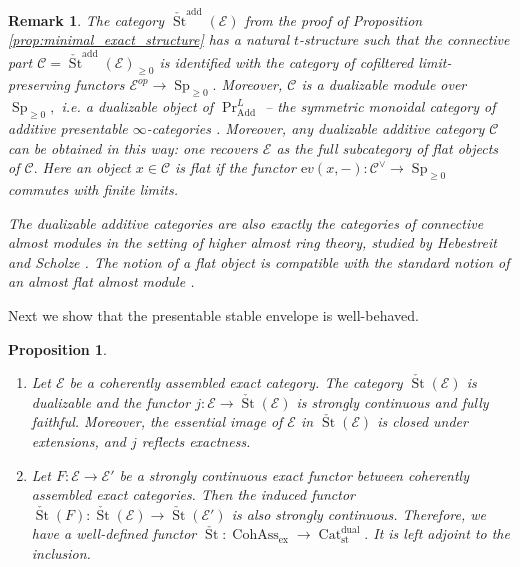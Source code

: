 \documentclass[11pt,leqno]{amsart}
\newtheorem{prop}[theo]{Proposition}
\newtheorem{remark}[theo]{Remark}
\numberwithin{equation}{section}
\newcommand{\Cat}{\operatorname{Cat}}
\newcommand{\ex}{\operatorname{ex}}
\newcommand{\St}{\operatorname{St}}
\newcommand{\st}{\operatorname{st}}
\newcommand{\dual}{\operatorname{dual}}
\newcommand{\ev}{\mathrm ev}
\newcommand{\cC}{{\mathcal C}}
\newcommand{\cE}{{\mathcal E}}
\newcommand{\Cohass}{\operatorname{CohAss}}
\newcommand{\Add}{\operatorname{Add}}
\newcommand{\Sp}{\operatorname{Sp}}
\newcommand{\add}{\operatorname{add}}
\begin{document}
\begin{remark}\label{rem:dualizable_additive_infty_categories}
The category $\check{\St}^{\add}(\cE)$ from the proof of Proposition \ref{prop:minimal_exact_structure} has a natural $t$-structure such that the connective part $\cC=\check{\St}^{\add}(\cE)_{\geq 0}$ is identified with the category of cofiltered limit-preserving functors $\cE^{op}\to\Sp_{\geq 0}.$ Moreover, $\cC$ is a dualizable module over $\Sp_{\geq 0},$ i.e. a dualizable object of $\Pr^L_{\Add}$ -- the symmetric monoidal category of additive presentable $\infty$-categories \cite{LLS}. Moreover, any dualizable additive category $\cC$ can be obtained in this way: one recovers $\cE$ as the full subcategory of flat objects of $\cC.$ Here an object $x\in\cC$ is flat if the functor $\ev(x,-):\cC^{\vee}\to\Sp_{\geq 0}$ commutes with finite limits.

The dualizable additive categories are also exactly the categories of connective almost modules in the setting of higher almost ring theory, studied by Hebestreit and Scholze \cite{HS24}. The notion of a flat object is compatible with the standard notion of an almost flat almost module \cite{Fa02, GR03}.
\end{remark}

Next we show that the presentable stable envelope is well-behaved.

\begin{prop}\label{prop:St_of_coherently_assembled}
\begin{enumerate}[label=(\roman*),ref=(\roman*)]
	\item Let $\cE$ be a coherently assembled exact category. The category $\check{\St}(\cE)$ is dualizable and the functor $j:\cE\to\check{\St}(\cE)$ is strongly continuous and fully faithful. Moreover, the essential image of $\cE$ in $\check{\St}(\cE)$ is closed under extensions, and $j$ reflects exactness. \label{St_of_coh_ass}
	\item Let $F:\cE\to\cE'$ be a strongly continuous exact functor between coherently assembled exact categories. Then the induced functor $\check{\St}(F):\check{\St}(\cE)\to\check{\St}(\cE')$ is also strongly continuous. Therefore, we have a well-defined functor $\check{\St}:\Cohass_{\ex}\to\Cat_{\st}^{\dual}.$ It is left adjoint to the inclusion. \label{St_from_cohass_ex_to_cat_st_dual}
\end{enumerate}
\end{prop}
\end{document}
